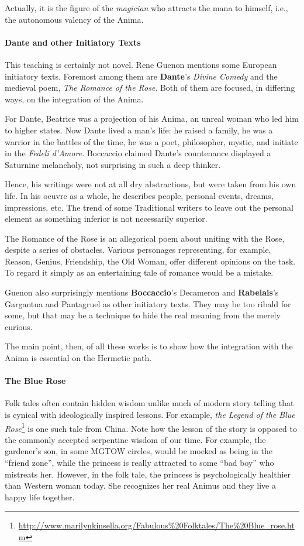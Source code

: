 \begin{quotex}
Actually, it is the figure of the \emph{magician} who attracts the mana to himself, i.e., the autonomous valency of the Anima. 

\end{quotex}
\paragraph{Dante and other Initiatory Texts}
This teaching is certainly not novel. Rene Guenon mentions some European initiatory texts. Foremost among them are \textbf{Dante}'s \emph{Divine Comedy} and the medieval poem, \emph{The Romance of the Rose}. Both of them are focused, in differing ways, on the integration of the Anima.

For Dante, Beatrice was a projection of his Anima, an unreal woman who led him to higher states. Now Dante lived a man's life: he raised a family, he was a warrior in the battles of the time, he was a poet, philosopher, mystic, and initiate in the \emph{Fedeli d'Amore}. Boccaccio claimed Dante's countenance displayed a Saturnine melancholy, not surprising in such a deep thinker.

Hence, his writings were not at all dry abstractions, but were taken from his own life. In his oeuvre as a whole, he describes people, personal events, dreams, impressions, etc. The trend of some Traditional writers to leave out the personal element as something inferior is not necessarily superior.

The Romance of the Rose is an allegorical poem about uniting with the Rose, despite a series of obstacles. Various personages representing, for example, Reason, Genius, Friendship, the Old Woman, offer different opinions on the task. To regard it simply as an entertaining tale of romance would be a mistake.

Guenon also surprisingly mentions \textbf{Boccaccio}'s Decameron and \textbf{Rabelais}'s Gargantua and Pantagruel as other initiatory texts. They may be too ribald for some, but that may be a technique to hide the real meaning from the merely curious.

The main point, then, of all these works is to show how the integration with the Anima is essential on the Hermetic path.

\paragraph{The Blue Rose}
Folk tales often contain hidden wisdom unlike much of modern story telling that is cynical with ideologically inspired lessons. For example, \emph{the Legend of the Blue Rose}\footnote{\url{http://www.marilynkinsella.org/Fabulous\%20Folktales/The\%20Blue_rose.htm}} is one such tale from China. Note how the lesson of the story is opposed to the commonly accepted serpentine wisdom of our time. For example, the gardener's son, in some MGTOW circles, would be mocked as being in the “friend zone”, while the princess is really attracted to some “bad boy” who mistreats her. However, in the folk tale, the princess is psychologically healthier than Western woman today. She recognizes her real Animus and they live a happy life together.

